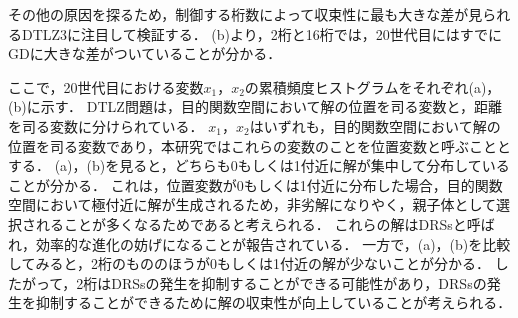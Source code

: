 \documentclass[../main/main]{subfiles}
\begin{document}
\begin{description}
\quad その他の原因を探るため，制御する桁数によって収束性に最も大きな差が見られるDTLZ3に注目して検証する．
(b)より，2桁と16桁では，20世代目にはすでにGDに大きな差がついていることが分かる．

\quad ここで，20世代目における変数$x_1$，$x_2$の累積頻度ヒストグラムをそれぞれ(a)，(b)に示す．
DTLZ問題は，目的関数空間において解の位置を司る変数と，距離を司る変数に分けられている．
$x_1$，$x_2$はいずれも，目的関数空間において解の位置を司る変数であり，本研究ではこれらの変数のことを位置変数と呼ぶこととする．
(a)，(b)を見ると，どちらも0もしくは1付近に解が集中して分布していることが分かる．
これは，位置変数が0もしくは1付近に分布した場合，目的関数空間において極付近に解が生成されるため，非劣解になりやく，親子体として選択されることが多くなるためであると考えられる．
これらの解はDRSsと呼ばれ，効率的な進化の妨げになることが報告されている．
一方で，(a)，(b)を比較してみると，2桁のもののほうが0もしくは1付近の解が少ないことが分かる．
したがって，2桁はDRSsの発生を抑制することができる可能性があり，DRSsの発生を抑制することができるために解の収束性が向上していることが考えられる．


\end{description}
\end{document}
